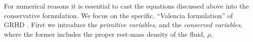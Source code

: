 For numerical reasons it is essential to cast the equations discussed above into 
the conservative formulation. We focus on the specific, ``Valencia formulation'' of 
\ac{GRHD} \citep{Banyuls:1997}. 
%
First we introduce the \textit{primitive variables}, and the \textit{conserved variables},
where the former includes the proper rest-mass density of the fluid, $\rho$, 
